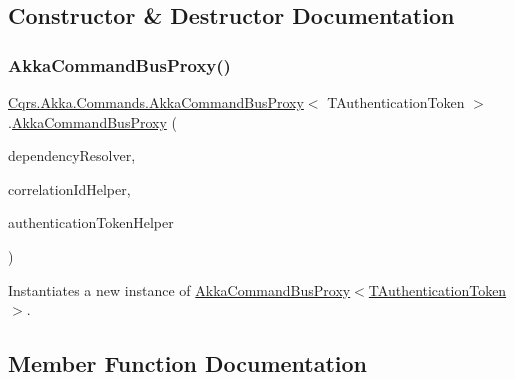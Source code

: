 \subsection{Constructor \& Destructor Documentation}
\mbox{\label{classCqrs_1_1Akka_1_1Commands_1_1AkkaCommandBusProxy_ad9a3fa7aa546bc2c398d4f52d0659656_ad9a3fa7aa546bc2c398d4f52d0659656}} 
\subsubsection{\texorpdfstring{Akka\+Command\+Bus\+Proxy()}{AkkaCommandBusProxy()}}
{\footnotesize\ttfamily \hyperlink{classCqrs_1_1Akka_1_1Commands_1_1AkkaCommandBusProxy}{Cqrs.\+Akka.\+Commands.\+Akka\+Command\+Bus\+Proxy}$<$ T\+Authentication\+Token $>$.\hyperlink{classCqrs_1_1Akka_1_1Commands_1_1AkkaCommandBusProxy}{Akka\+Command\+Bus\+Proxy} (\begin{DoxyParamCaption}\item[{\hyperlink{interfaceCqrs_1_1Configuration_1_1IDependencyResolver}{I\+Dependency\+Resolver}}]{dependency\+Resolver,  }\item[{I\+Correlation\+Id\+Helper}]{correlation\+Id\+Helper,  }\item[{\hyperlink{interfaceCqrs_1_1Authentication_1_1IAuthenticationTokenHelper}{I\+Authentication\+Token\+Helper}$<$ T\+Authentication\+Token $>$}]{authentication\+Token\+Helper }\end{DoxyParamCaption})}



Instantiates a new instance of \hyperlink{classCqrs_1_1Akka_1_1Commands_1_1AkkaCommandBusProxy_ad9a3fa7aa546bc2c398d4f52d0659656_ad9a3fa7aa546bc2c398d4f52d0659656}{Akka\+Command\+Bus\+Proxy$<$\+T\+Authentication\+Token$>$}. 



\subsection{Member Function Documentation}
\mbox{\label{classCqrs_1_1Akka_1_1Commands_1_1AkkaCommandBusProxy_a410c0fe52016d04de950b1ae767d2ccb_a410c0fe52016d04de950b1ae767d2ccb}} 
